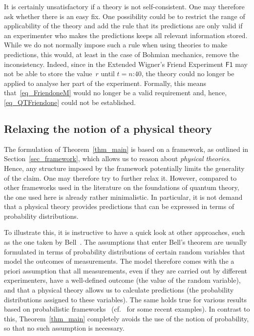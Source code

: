 \documentclass{article}
\theoremstyle{plain}
\theoremstyle{definition}
\newcommand*{\Friendone}{\mathsf{F1}}
\begin{document}
It is certainly unsatisfactory if a theory is not self-consistent. One may therefore ask whether there is an easy fix. One  possibility could be to restrict the range of applicability of the theory and add the rule that its predictions are only valid if an experimenter who makes the predictions keeps all relevant information stored.  While we do not normally impose such a rule when using theories to make predictions, this would, at least in the case of Bohmian mechanics, remove the inconsistency. Indeed, since in the Extended Wigner's Friend Experiment $\Friendone$ may not be able to store the value~$r$ until $t=\text{$n$:40}$, the theory could no longer be applied to analyse her part of the experiment. Formally, this means that~\eqref{eq_FriendoneM} would no longer be a valid requirement and, hence, \eqref{eq_QTFriendone} could not be established. 



\subsection{Relaxing the notion of a physical theory} \label{sec_theories}

The formulation of Theorem~\ref{thm_main} is based on a  framework, as outlined in Section~\ref{sec_framework}, which allows us to reason about \emph{physical theories}. Hence, any structure imposed by the framework potentially limits the generality of the claim. One may therefore try to further relax it. However, compared to other frameworks used in the literature on the foundations of quantum theory, the one used here is already rather minimalistic. In particular, it is not demand that a physical theory provides predictions that can be expressed in terms of probability distributions. 

To illustrate this, it is instructive to have a quick look at other approaches, such as the one taken by Bell~\cite{Bell66}. The assumptions that enter Bell's theorem are usually formulated in terms of probability distributions of certain random variables that model the outcomes of measurements.  The model therefore comes with the a priori assumption that all measurements, even if they are carried out by different experimenters, have a well-defined outcome (the value of the random variable), and that a physical theory allows us to calculate predictions (the probability distributions assigned to these variables). The same holds true for various results based on probabilistic frameworks~\cite{Barrett07,BarWil16} (cf.\ \cite{Hardy11,ChDaPe11,MasMul11,ColRen12,PuBaRu12,OrCoBr12,LeiSpe13} for some recent examples). In contrast to this, Theorem~\ref{thm_main} completely avoids the use of the notion of probability, so that no such assumption is necessary. 
\end{document}
